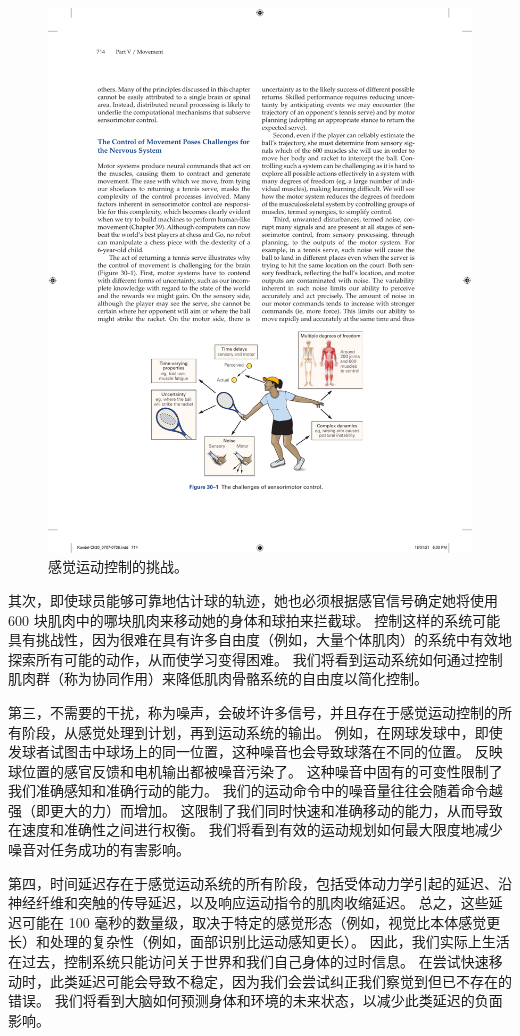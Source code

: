 \begin{figure}[htbp]
	\centering
	\includegraphics[width=0.65\linewidth]{chap30/fig_30_1}
	\caption{感觉运动控制的挑战。}
	\label{fig:30_1}
\end{figure}

其次，即使球员能够可靠地估计球的轨迹，她也必须根据感官信号确定她将使用 600 块肌肉中的哪块肌肉来移动她的身体和球拍来拦截球。 控制这样的系统可能具有挑战性，因为很难在具有许多自由度（例如，大量个体肌肉）的系统中有效地探索所有可能的动作，从而使学习变得困难。 我们将看到运动系统如何通过控制肌肉群（称为协同作用）来降低肌肉骨骼系统的自由度以简化控制。

第三，不需要的干扰，称为噪声，会破坏许多信号，并且存在于感觉运动控制的所有阶段，从感觉处理到计划，再到运动系统的输出。 例如，在网球发球中，即使发球者试图击中球场上的同一位置，这种噪音也会导致球落在不同的位置。 反映球位置的感官反馈和电机输出都被噪音污染了。 这种噪音中固有的可变性限制了我们准确感知和准确行动的能力。 我们的运动命令中的噪音量往往会随着命令越强（即更大的力）而增加。 这限制了我们同时快速和准确移动的能力，从而导致在速度和准确性之间进行权衡。 我们将看到有效的运动规划如何最大限度地减少噪音对任务成功的有害影响。

第四，时间延迟存在于感觉运动系统的所有阶段，包括受体动力学引起的延迟、沿神经纤维和突触的传导延迟，以及响应运动指令的肌肉收缩延迟。 总之，这些延迟可能在 100 毫秒的数量级，取决于特定的感觉形态（例如，视觉比本体感觉更长）和处理的复杂性（例如，面部识别比运动感知更长）。 因此，我们实际上生活在过去，控制系统只能访问关于世界和我们自己身体的过时信息。 在尝试快速移动时，此类延迟可能会导致不稳定，因为我们会尝试纠正我们察觉到但已不存在的错误。 我们将看到大脑如何预测身体和环境的未来状态，以减少此类延迟的负面影响。

